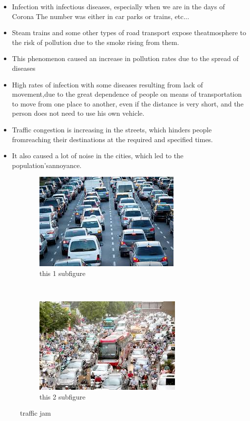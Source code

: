 \documentclass{article}
\begin{document}
\begin{itemize}
  \item Infection with infectious diseases, especially when we are in the days of 
Corona The number was either in car parks or trains, etc...
  \item Steam trains and some other types of road transport expose theatmosphere 
to the risk of pollution due to the smoke rising from them.
  \item This phenomenon caused an increase in pollution rates due to the spread of 
diseases
  \item High rates of infection with some diseases resulting from lack of 
movement,due to the great dependence of people on means of transportation 
to move from one place to another, even if the distance is very short, and the 
person does not need to use his own vehicle. 
  \item Traffic congestion is increasing in the streets, which hinders people 
fromreaching their destinations at the required and specified times.
  \item It also caused a lot of noise in the cities, which led to the 
population’sannoyance.
\end{itemize}
\begin{figure}[!h]
  
    \begin{subfigure}[!h]{0.40\columnwidth}
      \includegraphics{traffic.jpg}
       \caption{this 1 subfigure}
        \label{sfig 1}
     \end{subfigure}
~
     \begin{subfigure}[!h]{0.40\columnwidth}
      \includegraphics{traffic 2.jpg}
       \caption{this 2 subfigure}
        \label{sfig 2}
      \end{subfigure}
\caption{traffic jam}
\end{figure}
\end{document}
